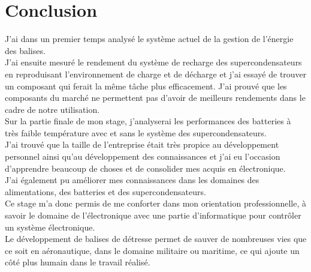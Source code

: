 \chapter{Conclusion}

J'ai dans un premier temps analysé le système actuel de la gestion de l'énergie des balises. \\
J'ai ensuite mesuré le rendement du système de recharge des supercondensateurs en reproduisant l'environnement de charge et de décharge et j'ai essayé de trouver un composant qui ferait la même tâche plus efficacement. J'ai prouvé que les composants du marché ne permettent pas d'avoir de meilleurs rendements dans le cadre de notre utilisation.\\

Sur la partie finale de mon stage, j'analyserai les performances des batteries à très faible température  avec et sans le système des supercondensateurs.\\


J’ai trouvé que la taille de l’entreprise était très propice au développement personnel ainsi qu’au développement des connaissances et j’ai eu l’occasion d’apprendre beaucoup de choses et de consolider mes acquis en électronique.\\
J'ai également pu améliorer mes connaissances dans les domaines des alimentations, des batteries et des supercondensateurs. \\

Ce stage m'a donc permis de me conforter dans mon orientation professionnelle, à savoir le domaine de l'électronique avec une partie d'informatique pour contrôler un système électronique.\\


Le développement de balises de détresse permet de sauver de nombreuses vies que ce soit en aéronautique, dans le domaine militaire ou maritime, ce qui ajoute un côté plus humain dans le travail réalisé.\\




